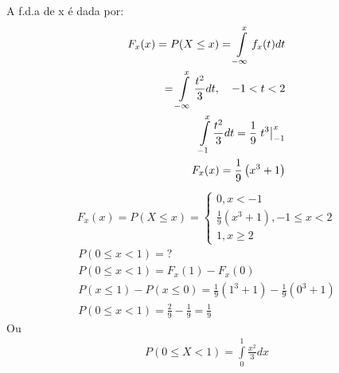 \begin{description}
       A f.d.a de x é dada por: 
       \begin{align*}
         F_{x}(x)= P(X \le x)= \int \limits_{-\infty}^{x} f_{x}(t) dt\\
         = \int \limits_{-\infty}^{x} \frac{t^2}{3} dt , \quad -1<t<2 \\
         \int \limits_{-1}^{x} \frac{t^2}{3} dt= \frac{1}{9} \left.t^3\right\rvert_{-1}^{x}\\
         F_{x}(x)= \frac{1}{9}\left(x^3 +1\right)\\
       \end{align*}
       \begin{align*}
         F_{x}(x)=P(X \le x)= 
         \begin{cases}
           0, x <-1 \\
           \frac{1}{9}(x^3 +1) , -1 \le x <2 \\
           1, x \geq 2
         \end{cases}
       \end{align*}
       \begin{align*}
         P(0 \le x <1)=? \\
         P(0 \le x <1)= {F}_{x}(1)- {F}_{x}(0)\\
         P(x \le 1 ) - P(x \le 0)= \frac{1}{9} (1^3 + 1 ) - \frac{1}{9}(0^3+ 1)\\
         P(0 \le x < 1 )= \frac{2}{9} - \frac{1}{9} = \frac{1}{9}
       \end{align*}
       Ou 
       \begin{align*}
         P(0 \leq X < 1) = \int \limits_{0}^{1} \frac{x^2 }{3}dx 
       \end{align*}
   \end{description}
